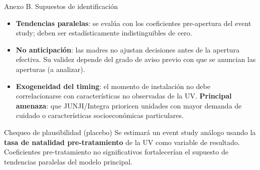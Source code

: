 \documentclass[aspectratio=169,10pt]{beamer}
\begin{document}
\begin{frame}{Anexo B. Supuestos de identificación}
\begin{itemize}
  \item \textbf{Tendencias paralelas}: se evalúa con los coeficientes pre-apertura del event study; deben ser estadísticamente indistinguibles de cero.
  \item \textbf{No anticipación}: las madres no ajustan decisiones antes de la apertura efectiva. Su validez depende del grado de aviso previo con que se anuncian las aperturas (a analizar).
  \item \textbf{Exogeneidad del timing}: el momento de instalación no debe correlacionarse con características no observadas de la UV. \textbf{Principal amenaza}: que JUNJI/Integra prioricen unidades con mayor demanda de cuidado o características socioeconómicas particulares.
\end{itemize}

\vspace{10pt}
\begin{block}{Chequeo de plausibilidad (placebo)}
\small Se estimará un event study análogo usando la \textbf{tasa de natalidad pre-tratamiento} de la UV como variable de resultado. Coeficientes pre-tratamiento no significativos fortalecerían el supuesto de tendencias paralelas del modelo principal.
\end{block}
\end{frame}
\end{document}
